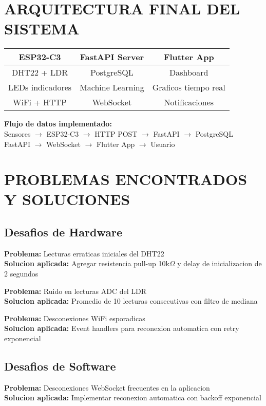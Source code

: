 \documentclass[11pt,letterpaper]{article}
\begin{document}
\section{ARQUITECTURA FINAL DEL SISTEMA}

\begin{center}
\begin{tabular}{|c|c|c|}
\hline
\textbf{ESP32-C3} & \textbf{FastAPI Server} & \textbf{Flutter App} \\
\hline
DHT22 + LDR & PostgreSQL & Dashboard \\
LEDs indicadores & Machine Learning & Graficos tiempo real \\
WiFi + HTTP & WebSocket & Notificaciones \\
\hline
\end{tabular}
\end{center}

\textbf{Flujo de datos implementado:}\\
Sensores $\rightarrow$ ESP32-C3 $\rightarrow$ HTTP POST $\rightarrow$ FastAPI $\rightarrow$ PostgreSQL\\
FastAPI $\rightarrow$ WebSocket $\rightarrow$ Flutter App $\rightarrow$ Usuario

\section{PROBLEMAS ENCONTRADOS Y SOLUCIONES}

\subsection{Desafios de Hardware}
\textbf{Problema:} Lecturas erraticas iniciales del DHT22\\
\textbf{Solucion aplicada:} Agregar resistencia pull-up 10k$\Omega$ y delay de inicializacion de 2 segundos

\textbf{Problema:} Ruido en lecturas ADC del LDR\\
\textbf{Solucion aplicada:} Promedio de 10 lecturas consecutivas con filtro de mediana

\textbf{Problema:} Desconexiones WiFi esporadicas\\
\textbf{Solucion aplicada:} Event handlers para reconexion automatica con retry exponencial

\subsection{Desafios de Software}
\textbf{Problema:} Desconexiones WebSocket frecuentes en la aplicacion\\
\textbf{Solucion aplicada:} Implementar reconexion automatica con backoff exponencial
\end{document}

